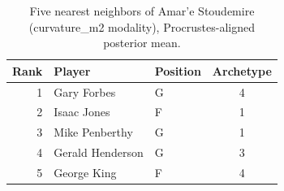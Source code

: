 \begin{table}[htbp]
  \centering\small
  \begin{tabular}{rllc}
    \toprule
    Rank & Player & Position & Archetype \\
    \midrule
    1 & Gary Forbes & G & 4 \\
    2 & Isaac Jones & F & 1 \\
    3 & Mike Penberthy & G & 1 \\
    4 & Gerald Henderson & G & 3 \\
    5 & George King & F & 4 \\
    \bottomrule
  \end{tabular}
  \caption{Five nearest neighbors of Amar'e Stoudemire (curvature_m2 modality), Procrustes-aligned posterior mean.}
  \label{tab:Amar_e_Stoudemire_neighbors_curvature_m2}
\end{table}

